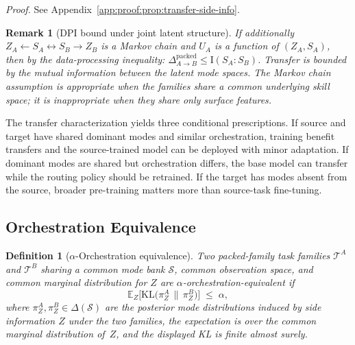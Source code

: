 \documentclass[10pt]{article}
\theoremstyle{paperplain}
\theoremstyle{paperdefinition}
\newtheorem{definition}[theorem]{Definition}
\theoremstyle{paperremark}
\newtheorem{remark}[theorem]{Remark}
\newcommand{\KL}{\mathrm{KL}}
\newcommand{\I}{\mathrm{I}}
\newcommand{\E}{\mathbb{E}}
\newcommand{\cS}{\mathcal{S}}
\newcommand{\cT}{\mathcal{T}}
\begin{document}
\par\noindent\emph{Proof.} See Appendix~\ref{app:proof:prop:transfer-side-info}.\par


\begin{remark}[DPI bound under joint latent structure]
\label{rem:dpi-transfer}
If additionally $Z_A \leftarrow S_A \leftrightarrow S_B \rightarrow Z_B$ is a Markov chain and $U_A$ is a function of $(Z_A,S_A)$, then by the data-processing inequality:
$\Delta^{\mathrm{packed}}_{A \to B} \le \I(S_A : S_B)$.
Transfer is bounded by the mutual information between the latent mode spaces.
The Markov chain assumption is appropriate when the families share a common underlying skill space; it is inappropriate when they share only surface features.
\end{remark}

The transfer characterization yields three conditional prescriptions. If source and target have shared dominant modes and similar orchestration, training benefit transfers and the source-trained model can be deployed with minor adaptation. If dominant modes are shared but orchestration differs, the base model can transfer while the routing policy should be retrained. If the target has modes absent from the source, broader pre-training matters more than source-task fine-tuning.

\subsection{Orchestration Equivalence}
\label{subsec:orch-equiv}

\begin{definition}[$\alpha$-Orchestration equivalence]
\label{def:orch-equiv}
Two packed-family task families $\cT^A$ and $\cT^B$ sharing a common mode bank $\cS$, common observation space, and common marginal distribution for $Z$ are \emph{$\alpha$-orchestration-equivalent} if
\begin{equation}
\label{eq:orch-equiv-def}
\E_Z\!\bigl[\KL\!\bigl(\pi^A_Z \,\big\|\, \pi^B_Z\bigr)\bigr] \;\le\; \alpha,
\end{equation}
where $\pi^A_Z, \pi^B_Z \in \Delta(\cS)$ are the posterior mode distributions induced by side information $Z$ under the two families, the expectation is over the common marginal distribution of~$Z$, and the displayed KL is finite almost surely.
\end{definition}
\end{document}
